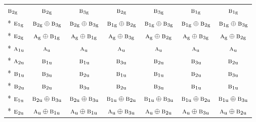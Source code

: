 \documentclass[10pt,a4paper]{article}
\numberwithin{equation}{section}
\newcommand{\irr}[1]{\text{\normalfont\scshape #1}}
\newcommand{\ptag}[1]{\mathrm{#1}}
\begin{document}
{\begin{longtable}{@{}lcccccc@{}}
$\irr{b}_{2\ptag{g}}$ & $\irr{b}_{2\ptag{g}}$ & $\irr{b}_{3\ptag{g}}$ & $\irr{b}_{2\ptag{g}}$ & $\irr{b}_{3\ptag{g}}$ & $\irr{b}_{1\ptag{g}}$ & $\irr{b}_{1\ptag{g}}$\\*
$\irr{e}_{1\ptag{g}}$ & $\irr{b}_{2\ptag{g}}\oplus \irr{b}_{3\ptag{g}}$ & $\irr{b}_{2\ptag{g}}\oplus \irr{b}_{3\ptag{g}}$ & $\irr{b}_{1\ptag{g}}\oplus \irr{b}_{2\ptag{g}}$ & $\irr{b}_{1\ptag{g}}\oplus \irr{b}_{3\ptag{g}}$ & $\irr{b}_{1\ptag{g}}\oplus \irr{b}_{2\ptag{g}}$ & $\irr{b}_{1\ptag{g}}\oplus \irr{b}_{3\ptag{g}}$\\*
$\irr{e}_{2\ptag{g}}$ & $\irr{a}_{\ptag{g}}\oplus \irr{b}_{1\ptag{g}}$ & $\irr{a}_{\ptag{g}}\oplus \irr{b}_{1\ptag{g}}$ & $\irr{a}_{\ptag{g}}\oplus \irr{b}_{3\ptag{g}}$ & $\irr{a}_{\ptag{g}}\oplus \irr{b}_{2\ptag{g}}$ & $\irr{a}_{\ptag{g}}\oplus \irr{b}_{3\ptag{g}}$ & $\irr{a}_{\ptag{g}}\oplus \irr{b}_{2\ptag{g}}$\\*
$\irr{a}_{1\ptag{u}}$ & $\irr{a}_{\ptag{u}}$ & $\irr{a}_{\ptag{u}}$ & $\irr{a}_{\ptag{u}}$ & $\irr{a}_{\ptag{u}}$ & $\irr{a}_{\ptag{u}}$ & $\irr{a}_{\ptag{u}}$\\*
$\irr{a}_{2\ptag{u}}$ & $\irr{b}_{1\ptag{u}}$ & $\irr{b}_{1\ptag{u}}$ & $\irr{b}_{3\ptag{u}}$ & $\irr{b}_{2\ptag{u}}$ & $\irr{b}_{3\ptag{u}}$ & $\irr{b}_{2\ptag{u}}$\\*
$\irr{b}_{1\ptag{u}}$ & $\irr{b}_{3\ptag{u}}$ & $\irr{b}_{2\ptag{u}}$ & $\irr{b}_{1\ptag{u}}$ & $\irr{b}_{1\ptag{u}}$ & $\irr{b}_{2\ptag{u}}$ & $\irr{b}_{3\ptag{u}}$\\*
$\irr{b}_{2\ptag{u}}$ & $\irr{b}_{2\ptag{u}}$ & $\irr{b}_{3\ptag{u}}$ & $\irr{b}_{2\ptag{u}}$ & $\irr{b}_{3\ptag{u}}$ & $\irr{b}_{1\ptag{u}}$ & $\irr{b}_{1\ptag{u}}$\\*
$\irr{e}_{1\ptag{u}}$ & $\irr{b}_{2\ptag{u}}\oplus \irr{b}_{3\ptag{u}}$ & $\irr{b}_{2\ptag{u}}\oplus \irr{b}_{3\ptag{u}}$ & $\irr{b}_{1\ptag{u}}\oplus \irr{b}_{2\ptag{u}}$ & $\irr{b}_{1\ptag{u}}\oplus \irr{b}_{3\ptag{u}}$ & $\irr{b}_{1\ptag{u}}\oplus \irr{b}_{2\ptag{u}}$ & $\irr{b}_{1\ptag{u}}\oplus \irr{b}_{3\ptag{u}}$\\*
$\irr{e}_{2\ptag{u}}$ & $\irr{a}_{\ptag{u}}\oplus \irr{b}_{1\ptag{u}}$ & $\irr{a}_{\ptag{u}}\oplus \irr{b}_{1\ptag{u}}$ & $\irr{a}_{\ptag{u}}\oplus \irr{b}_{3\ptag{u}}$ & $\irr{a}_{\ptag{u}}\oplus \irr{b}_{2\ptag{u}}$ & $\irr{a}_{\ptag{u}}\oplus \irr{b}_{3\ptag{u}}$ & $\irr{a}_{\ptag{u}}\oplus \irr{b}_{2\ptag{u}}$\\
\bottomrule\end{longtable}}
\end{document}

